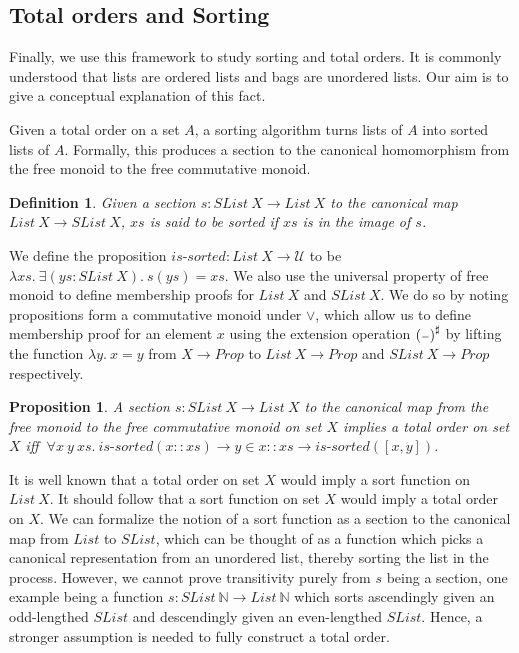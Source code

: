 \documentclass{article}
\begin{document}
\subsection*{Total orders and Sorting}

\newtheorem{myconj}{Conjecture}
\newtheorem{mydef}{Definition}
\newtheorem{mylemma}{Lemma}
\newtheorem{mythm}{Proposition}

Finally, we use this framework to study sorting and total orders. It is commonly understood that lists are ordered
lists and bags are unordered lists. Our aim is to give a conceptual explanation of this fact.

Given a total order on a set $A$, a sorting algorithm turns lists of $A$ into sorted lists of $A$.
%
Formally, this produces a section to the canonical homomorphism from the free monoid to the free commutative monoid.

\begin{mydef}
    Given a section $s : SList \: X \rightarrow List \: X$ to the canonical map $List \: X \rightarrow SList \: X$,
    $xs$ is said to be sorted if $xs$ is in the image of $s$.
\end{mydef}

We define the proposition $\textit{is-sorted} : List \: X \rightarrow \mathcal{U}$ to be
$\lambda xs. \: \exists (ys : SList \: X). \: s(ys) = xs$.
We also use the universal property of free monoid to define membership proofs for $List \: X$ and $SList \: X$.
We do so by noting propositions form a commutative monoid under $\vee$,
which allow us to define membership proof for an element $x$ using the extension operation ${({\scriptstyle{-}})}^{\sharp}$
by lifting the function $\lambda y. \: x = y$ from $X \rightarrow Prop$ to $List \: X \rightarrow Prop$ and $SList \: X \rightarrow Prop$ respectively.

\begin{mythm}
    A section $s : SList \: X \rightarrow List \: X$ to the canonical map from the free monoid to the free commutative monoid on set $X$
    implies a total order on set $X$ iff
    $\: \forall x \: y \: xs. \: \textit{is-sorted}(x :: xs) \rightarrow y \in x :: xs \rightarrow \textit{is-sorted}([x, y])$.
\end{mythm}
It is well known that a total order on set $X$ would imply a sort function on $List \: X$. It should follow that a sort function on set $X$
would imply a total order on $X$. We can formalize the notion of a sort function as a section to the canonical map from $List$ to
$SList$, which can be thought of as a function which picks a canonical representation from an unordered list, thereby sorting
the list in the process. However, we cannot prove transitivity purely from $s$ being a section, one example being
a function $s : SList \: \mathbb{N} \rightarrow List \: \mathbb{N}$ which sorts ascendingly given an odd-lengthed
$SList$ and descendingly given an even-lengthed $SList$. Hence, a stronger assumption is needed to fully construct
a total order.
\end{document}
